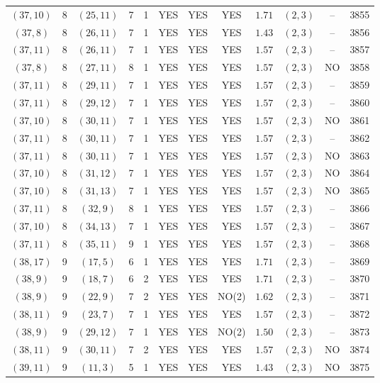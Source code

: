 \begin{longtable}{|c|c|c|c|c|c|c|c|c|c|c|c|}
$(37,10)$ & 8 & $(25,11)$ & 7 & 1 & YES & YES & YES & $1.71$ & $(2,3)$ & -- & 3855\\
$(37,8)$ & 8 & $(26,11)$ & 7 & 1 & YES & YES & YES & $1.43$ & $(2,3)$ & -- & 3856\\
$(37,11)$ & 8 & $(26,11)$ & 7 & 1 & YES & YES & YES & $1.57$ & $(2,3)$ & -- & 3857\\
$(37,8)$ & 8 & $(27,11)$ & 8 & 1 & YES & YES & YES & $1.57$ & $(2,3)$ & NO & 3858\\
$(37,11)$ & 8 & $(29,11)$ & 7 & 1 & YES & YES & YES & $1.57$ & $(2,3)$ & -- & 3859\\
$(37,11)$ & 8 & $(29,12)$ & 7 & 1 & YES & YES & YES & $1.57$ & $(2,3)$ & -- & 3860\\
$(37,10)$ & 8 & $(30,11)$ & 7 & 1 & YES & YES & YES & $1.57$ & $(2,3)$ & NO & 3861\\
$(37,11)$ & 8 & $(30,11)$ & 7 & 1 & YES & YES & YES & $1.57$ & $(2,3)$ & -- & 3862\\
$(37,11)$ & 8 & $(30,11)$ & 7 & 1 & YES & YES & YES & $1.57$ & $(2,3)$ & NO & 3863\\
$(37,10)$ & 8 & $(31,12)$ & 7 & 1 & YES & YES & YES & $1.57$ & $(2,3)$ & NO & 3864\\
$(37,10)$ & 8 & $(31,13)$ & 7 & 1 & YES & YES & YES & $1.57$ & $(2,3)$ & NO & 3865\\
$(37,11)$ & 8 & $(32,9)$ & 8 & 1 & YES & YES & YES & $1.57$ & $(2,3)$ & -- & 3866\\
$(37,10)$ & 8 & $(34,13)$ & 7 & 1 & YES & YES & YES & $1.57$ & $(2,3)$ & -- & 3867\\
$(37,11)$ & 8 & $(35,11)$ & 9 & 1 & YES & YES & YES & $1.57$ & $(2,3)$ & -- & 3868\\
$(38,17)$ & 9 & $(17,5)$ & 6 & 1 & YES & YES & YES & $1.71$ & $(2,3)$ & -- & 3869\\
$(38,9)$ & 9 & $(18,7)$ & 6 & 2 & YES & YES & YES & $1.71$ & $(2,3)$ & -- & 3870\\
$(38,9)$ & 9 & $(22,9)$ & 7 & 2 & YES & YES & NO(2) & $1.62$ & $(2,3)$ & -- & 3871\\
$(38,11)$ & 9 & $(23,7)$ & 7 & 1 & YES & YES & YES & $1.57$ & $(2,3)$ & -- & 3872\\
$(38,9)$ & 9 & $(29,12)$ & 7 & 1 & YES & YES & NO(2) & $1.50$ & $(2,3)$ & -- & 3873\\
$(38,11)$ & 9 & $(30,11)$ & 7 & 2 & YES & YES & YES & $1.57$ & $(2,3)$ & NO & 3874\\
$(39,11)$ & 9 & $(11,3)$ & 5 & 1 & YES & YES & YES & $1.43$ & $(2,3)$ & NO & 3875\\

\end{longtable}

